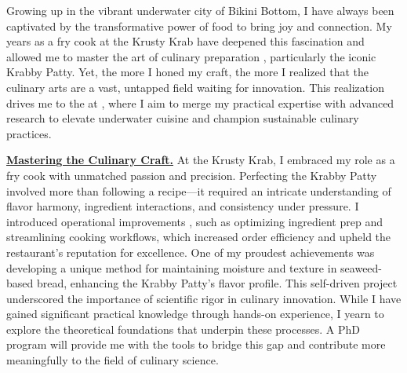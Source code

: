 
Growing up in the vibrant underwater city of Bikini Bottom, I have always been captivated by the transformative power of food to bring joy and connection. My years as a fry cook at the Krusty Krab have deepened this fascination and allowed me to master the art of culinary preparation \cite{ref1, ref2, ref3, ref4}, particularly the iconic Krabby Patty. Yet, the more I honed my craft, the more I realized that the culinary arts are a vast, untapped field waiting for innovation. This realization drives me to the \GetProgramName at \GetUniversityName, where I aim to merge my practical expertise with advanced research to elevate underwater cuisine and champion sustainable culinary practices. \\ \vspace{-4pt}

\textbf{\underline{Mastering the Culinary Craft.}}
At the Krusty Krab, I embraced my role as a fry cook with unmatched passion and precision. Perfecting the Krabby Patty involved more than following a recipe---it required an intricate understanding of flavor harmony, ingredient interactions, and consistency under pressure. I introduced operational improvements \cite{ref1}, such as optimizing ingredient prep and streamlining cooking workflows, which increased order efficiency and upheld the restaurant's reputation for excellence.
One of my proudest achievements was developing a unique method for maintaining moisture and texture in seaweed-based bread, enhancing the Krabby Patty's flavor profile. This self-driven project underscored the importance of scientific rigor in culinary innovation. While I have gained significant practical knowledge through hands-on experience, I yearn to explore the theoretical foundations that underpin these processes. A PhD program will provide me with the tools to bridge this gap and contribute more meaningfully to the field of culinary science. \\ \vspace{-4pt}

